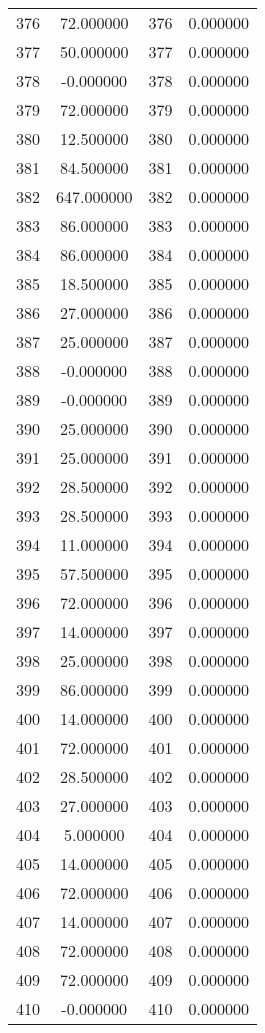 \documentclass[12pt]{article}
\begin{document}
\begin{longtable}{@{}cccc@{}}
376 & 72.000000 & 376 & 0.000000 \\
377 & 50.000000 & 377 & 0.000000 \\
378 & -0.000000 & 378 & 0.000000 \\
379 & 72.000000 & 379 & 0.000000 \\
380 & 12.500000 & 380 & 0.000000 \\
381 & 84.500000 & 381 & 0.000000 \\
382 & 647.000000 & 382 & 0.000000 \\
383 & 86.000000 & 383 & 0.000000 \\
384 & 86.000000 & 384 & 0.000000 \\
385 & 18.500000 & 385 & 0.000000 \\
386 & 27.000000 & 386 & 0.000000 \\
387 & 25.000000 & 387 & 0.000000 \\
388 & -0.000000 & 388 & 0.000000 \\
389 & -0.000000 & 389 & 0.000000 \\
390 & 25.000000 & 390 & 0.000000 \\
391 & 25.000000 & 391 & 0.000000 \\
392 & 28.500000 & 392 & 0.000000 \\
393 & 28.500000 & 393 & 0.000000 \\
394 & 11.000000 & 394 & 0.000000 \\
395 & 57.500000 & 395 & 0.000000 \\
396 & 72.000000 & 396 & 0.000000 \\
397 & 14.000000 & 397 & 0.000000 \\
398 & 25.000000 & 398 & 0.000000 \\
399 & 86.000000 & 399 & 0.000000 \\
400 & 14.000000 & 400 & 0.000000 \\
401 & 72.000000 & 401 & 0.000000 \\
402 & 28.500000 & 402 & 0.000000 \\
403 & 27.000000 & 403 & 0.000000 \\
404 & 5.000000 & 404 & 0.000000 \\
405 & 14.000000 & 405 & 0.000000 \\
406 & 72.000000 & 406 & 0.000000 \\
407 & 14.000000 & 407 & 0.000000 \\
408 & 72.000000 & 408 & 0.000000 \\
409 & 72.000000 & 409 & 0.000000 \\
410 & -0.000000 & 410 & 0.000000 \\

\end{longtable}
\end{document}

